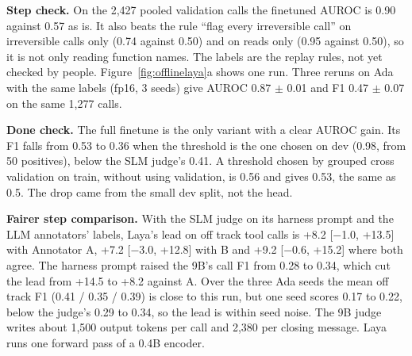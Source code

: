 \documentclass[10pt,a4paper]{article}
\begin{document}
\textbf{Step check.} On the 2,427 pooled validation calls the finetuned AUROC is 0.90 against 0.57 as is. It also beats the rule ``flag every irreversible call'' on irreversible calls only (0.74 against 0.50) and on reads only (0.95 against 0.50), so it is not only reading function names. The labels are the replay rules, not yet checked by people. Figure~\ref{fig:offlinelaya}a shows one run. Three reruns on Ada with the same labels (fp16, 3 seeds) give AUROC 0.87 $\pm$ 0.01 and F1 0.47 $\pm$ 0.07 on the same 1,277 calls.

\textbf{Done check.} The full finetune is the only variant with a clear AUROC gain. Its F1 falls from 0.53 to 0.36 when the threshold is the one chosen on dev (0.98, from 50 positives), below the SLM judge's 0.41. A threshold chosen by grouped cross validation on train, without using validation, is 0.56 and gives 0.53, the same as 0.5. The drop came from the small dev split, not the head.

\textbf{Fairer step comparison.} With the SLM judge on its harness prompt and the LLM annotators' labels, Laya's lead on off track tool calls is +8.2 [$-$1.0, +13.5] with Annotator A, +7.2 [$-$3.0, +12.8] with B and +9.2 [$-$0.6, +15.2] where both agree. The harness prompt raised the 9B's call F1 from 0.28 to 0.34, which cut the lead from +14.5 to +8.2 against A. Over the three Ada seeds the mean off track F1 (0.41 / 0.35 / 0.39) is close to this run, but one seed scores 0.17 to 0.22, below the judge's 0.29 to 0.34, so the lead is within seed noise. The 9B judge writes about 1,500 output tokens per call and 2,380 per closing message. Laya runs one forward pass of a 0.4B encoder.
\end{document}
